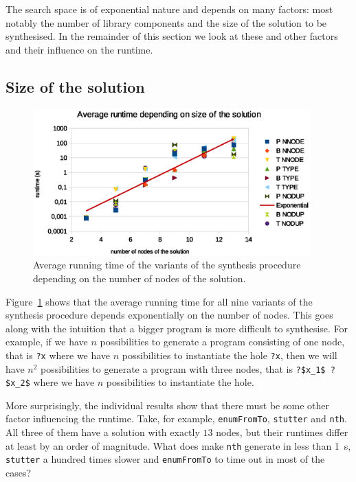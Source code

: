The search space is of exponential nature and depends on many factors: most notably the number of library components and the size of the solution to be synthesised. In the remainder of this section we look at these and other factors and their influence on the runtime.

\subsection{Size of the solution}
\begin{figure}[p]
    \centering
    \includegraphics[width=0.95\textwidth]{time_vs_nof_nodes.eps}
    \caption{Average running time of the variants of the synthesis procedure depending on the number of nodes of the solution.}
    \label{fig:runtime_vs_nof_nodes}
\end{figure}
Figure~\ref{fig:runtime_vs_nof_nodes} shows that the average running time for all nine variants of the synthesis procedure depends exponentially on the number of nodes. This goes along with the intuition that a bigger program is more difficult to synthesise.
For example, if we have $n$ possibilities to generate a program consisting of one node, that is \lstinline!?x! where we have $n$ possibilities to instantiate the hole \lstinline!?x!, then we will have $n^2$ possibilities to generate a program with three nodes, that is \lstinline!?$x_1$ ?$x_2$! where we have $n$ possibilities to instantiate the hole.


More surprisingly, the individual results show that there must be some other factor influencing the runtime. Take, for example, \lstinline?enumFromTo?, \lstinline?stutter? and \lstinline?nth?. All three of them have a solution with exactly $13$ nodes, but their runtimes differ at least by an order of magnitude. What does make \lstinline?nth? generate in less than \SI{1}{s}, \lstinline?stutter? a hundred times slower and \lstinline?enumFromTo? to time out in most of the cases?

